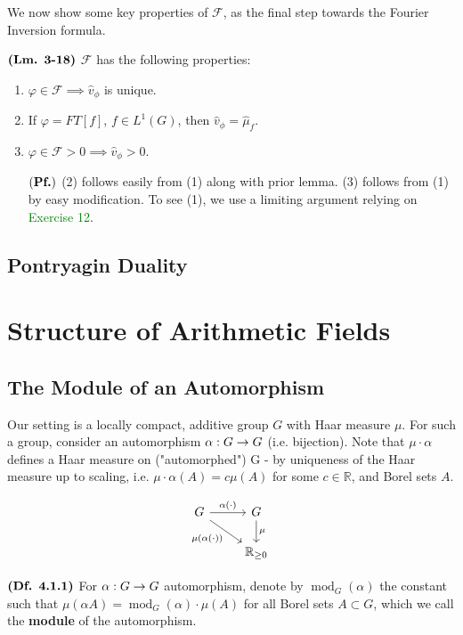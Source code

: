 \documentclass{article}
\DeclareMathOperator{\modl}{mod}
\begin{document}
We now show some key properties of $\mathcal{F}$, as the final step towards the Fourier Inversion formula.

$\textbf{(Lm. 3-18)}$ $\mathcal{F}$ has the following properties:
\begin{enumerate}
    \item $\varphi \in \mathcal{F} \implies \hat{v}_{\phi}$ is unique.
    \item If $\varphi = FT[f]$, $f \in L^1(G)$, then $\hat{v}_{\phi} = \hat{\mu}_{f}$.
    \item $\varphi \in \mathcal{F} > 0 \implies \hat{v}_{\phi} > 0$.

$(\textbf{Pf.})$ (2) follows easily from (1) along with prior lemma. (3) follows from (1) by easy modification. To see (1), we use a limiting argument relying on \textcolor{green}{Exercise 12}.
\end{enumerate}












\subsection{Pontryagin Duality}

\section{Structure of Arithmetic Fields}
\subsection{The Module of an Automorphism}
Our setting is a locally compact, additive group $G$ with Haar measure $\mu$. For such a group, consider an automorphism $\alpha:G \rightarrow G$ (i.e. bijection). Note that $\mu \cdot \alpha$ defines a Haar measure on ("automorphed") G - by uniqueness of the Haar measure up to scaling, i.e. $\mu \cdot \alpha(A) = c \mu(A)$ for some $c \in \mathbb{R}$, and Borel sets $A$. 

\[\begin{tikzcd}
	G & G \\
	& {\mathbb{R}_{\geq 0}}
	\arrow["{\alpha(\cdot)}", from=1-1, to=1-2]
	\arrow["\mu", from=1-2, to=2-2]
	\arrow["{\mu(\alpha(\cdot))}"', from=1-1, to=2-2]
\end{tikzcd}\]

$\textbf{(Df. 4.1.1)}$ For $\alpha:G \rightarrow G$ automorphism, denote by $\modl_G(\alpha)$ the constant such that $\mu(\alpha A) = \modl_G(\alpha) \cdot\mu(A)$ for all Borel sets $A \subset G$, which we call the \textbf{module} of the automorphism.
\end{document}
